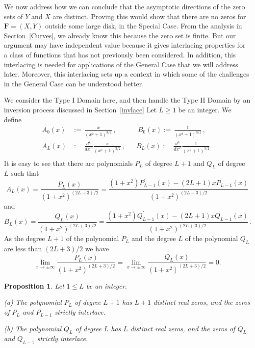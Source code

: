 \documentclass{article}
\newtheorem{prop}[thm]{Proposition}
\theoremstyle{remark}
\numberwithin{equation}{section}
\begin{document}
We now address how we can conclude that the asymptotic directions of the zero sets of $Y$ and $X$ are distinct.  Proving this would show that there are no zeros
for ${\mathbf F}=(X,Y)$ outside some large disk, in the Special Case.  From the analysis in Section~\ref{Curves}, we already know this because the zero set is finite.
But our argument may have independent value because it gives interlacing properties for a class of functions that has not previously been considered. In addition,
this interlacing is needed for applications of the General Case that we will address later.  Moreover, this interlacing sets up a context in which some of the
challenges in the General Case can be understood better.

We consider the Type I Domain here, and then handle the Type II Domain by an inversion process discussed in Section~\ref{invlace} 
Let $L \geq 1$ be an integer. We define
\begin{align*} A_0(x) & := \, \frac{x}{(x^2+1)^{3/2}}\,, && \  B_0(x) := \, \frac{1}{(x^2+1)^{3/2}}\,, \\
A_L(x) & := \, \frac{d^L}{dx^L} \frac{x}{(x^2+1)^{3/2}}\,, &&  B_L(x) := \, \frac{d^L}{dx^L} \frac{1}{(x^2+1)^{3/2}}\,. \\
\end{align*}
It is easy to see that there are polynomials $P_L$ of degree $L+1$ and $Q_L$ of degree $L$ such
that
$$A_L(x) = \frac{P_L(x)}{(1+x^2)^{(2L+3)/2}} = \frac{(1+x^2)P_{L-1}^\prime(x) - (2L+1)xP_{L-1}(x)}{(1+x^2)^{(2L+3)/2}}$$
and
$$B_L(x) = \frac{Q_L(x)}{(1+x^2)^{(2L+3)/2}} = \frac{(1+x^2)Q_{L-1}^\prime(x) - (2L+1)xQ_{L-1}(x)}{(1+x^2)^{(2L+3)/2}}\,.$$
As the degree $L+1$ of the polynomial $P_L$ and the degree $L$ of the polynomial $Q_L$ are
less than $(2L+3)/2$ we have
\begin{equation} \label{F16} \lim_{x \rightarrow \pm \infty}{\frac{P_L(x)}{(1+x^2)^{(2L+3)/2}}} = 
\lim_{x \rightarrow \pm \infty}{\frac{Q_L(x)}{(1+x^2)^{(2L+3)/2}}} = 0.
\end{equation}

\begin{prop}\label{PLPINTERLACE} Let $1 \leq L$ be an integer.

\medskip

\noindent (a) The polynomial $P_L$ of degree $L+1$ has $L+1$ distinct real zeros,
and the zeros of $P_L$ and $P_{L-1}$ strictly interlace.

\medskip

\noindent (b) The polynomial $Q_L$ of degree $L$ has $L$ distinct real zeros,
and the zeros of $Q_L$ and $Q_{L-1}$ strictly interlace.

\end{prop}
\end{document}
